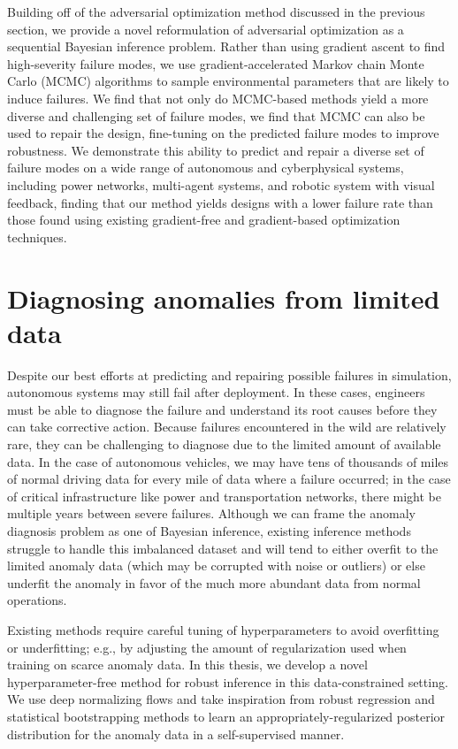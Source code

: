Building off of the adversarial optimization method discussed in the previous section, we provide a novel reformulation of adversarial optimization as a sequential Bayesian inference problem. Rather than using gradient ascent to find high-severity failure modes, we use gradient-accelerated Markov chain Monte Carlo (MCMC) algorithms to sample environmental parameters that are likely to induce failures. We find that not only do MCMC-based methods yield a more diverse and challenging set of failure modes, we find that MCMC can also be used to repair the design, fine-tuning on the predicted failure modes to improve robustness. We demonstrate this ability to predict and repair a diverse set of failure modes on a wide range of autonomous and cyberphysical systems, including power networks, multi-agent systems, and robotic system with visual feedback, finding that our method yields designs with a lower failure rate than those found using existing gradient-free and gradient-based optimization techniques.

\section{Diagnosing anomalies from limited data}

Despite our best efforts at predicting and repairing possible failures in simulation, autonomous systems may still fail after deployment. In these cases, engineers must be able to diagnose the failure and understand its root causes before they can take corrective action. Because failures encountered in the wild are relatively rare, they can be challenging to diagnose due to the limited amount of available data. In the case of autonomous vehicles, we may have tens of thousands of miles of normal driving data for every mile of data where a failure occurred; in the case of critical infrastructure like power and transportation networks, there might be multiple years between severe failures. Although we can frame the anomaly diagnosis problem as one of Bayesian inference, existing inference methods struggle to handle this imbalanced dataset and will tend to either overfit to the limited anomaly data (which may be corrupted with noise or outliers) or else underfit the anomaly in favor of the much more abundant data from normal operations.

Existing methods require careful tuning of hyperparameters to avoid overfitting or underfitting; e.g., by adjusting the amount of regularization used when training on scarce anomaly data. In this thesis, we develop a novel hyperparameter-free method \ouralg{} for robust inference in this data-constrained setting. We use deep normalizing flows and take inspiration from robust regression and statistical bootstrapping methods to learn an appropriately-regularized posterior distribution for the anomaly data in a self-supervised manner.

